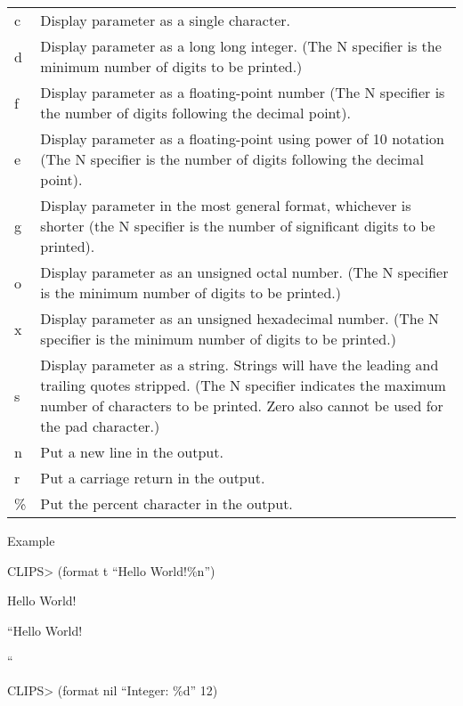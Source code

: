 \documentclass[letterpaper,10pt,english]{sphinxmanual}
\begin{document}
\begin{savenotes}\sphinxattablestart
\centering
\begin{tabulary}{\linewidth}[t]{|T|T|}
\hline
\sphinxstyletheadfamily 
{}
&\sphinxstyletheadfamily 
{}
\\
\hline
c
&
Display parameter as a single character.
\\
\hline
d
&
Display parameter as a long long integer. (The N specifier is the minimum number of digits to be printed.)
\\
\hline
f
&
Display parameter as a floating-point number (The N specifier is the number of digits following the decimal point).
\\
\hline
e
&
Display parameter as a floating-point using power of 10 notation (The N specifier is the number of digits following the decimal point).
\\
\hline
g
&
Display parameter in the most general format, whichever is shorter (the N specifier is the number of significant digits to be printed).
\\
\hline
o
&
Display parameter as an unsigned octal number. (The N specifier is the minimum number of digits to be printed.)
\\
\hline
x
&
Display parameter as an unsigned hexadecimal number. (The N specifier is the minimum number of digits to be printed.)
\\
\hline
s
&
Display parameter as a string. Strings will have the leading and trailing quotes stripped. (The N specifier indicates the maximum number of characters to be printed. Zero also cannot be used for the pad character.)
\\
\hline
n
&
Put a new line in the output.
\\
\hline
r
&
Put a carriage return in the output.
\\
\hline
\%
&
Put the percent character in the output.
\\
\hline
\end{tabulary}
\par
\sphinxattableend\end{savenotes}

Example

CLIPS\textgreater{} (format t “Hello World!\%n”)

Hello World!

“Hello World!

“

CLIPS\textgreater{} (format nil “Integer: \textbar{}\%d\textbar{}” 12)
\end{document}
